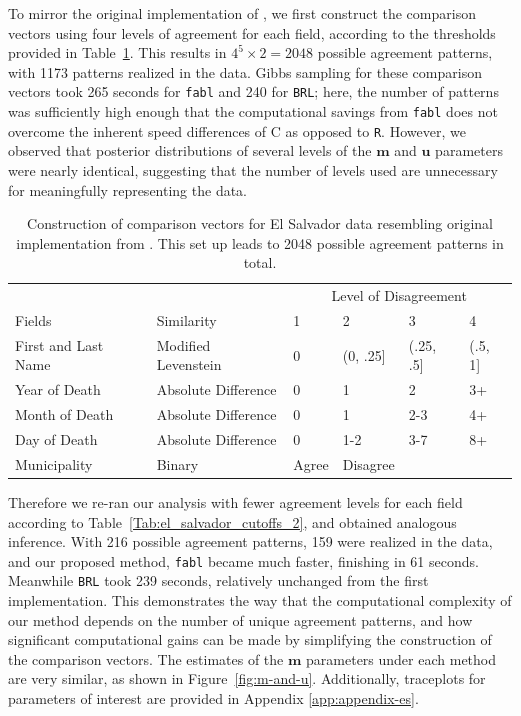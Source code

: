 \documentclass[ba]{imsart}
\begin{document}
To mirror the original implementation of \cite{sadinle_bayesian_2017}, we first construct the comparison vectors using four levels of agreement for each field, according to the thresholds provided in Table~\ref{Tab:el_salvador_cutoffs_1}. This results in \(4^5 \times 2 = 2048\) possible agreement patterns, with 1173 patterns realized in the data. Gibbs sampling for these comparison vectors took 265 seconds for \texttt{fabl} and 240 for \texttt{BRL}; here, the number of patterns was sufficiently high enough that the computational savings from \texttt{fabl} does not overcome the inherent speed differences of C as opposed to \texttt{R}. However, we observed that posterior distributions of several levels of the \(\bm{m}\) and \(\bm{u}\) parameters were nearly identical, suggesting that the number of levels used are unnecessary for meaningfully representing the data.

\begin{table}
	\begin{tabular}[t]{llllll}
		\hline
		\multicolumn{2}{c}{ } & \multicolumn{4}{c}{Level of Disagreement} \\
		\cline{3-6}
		Fields & Similarity & 1 & 2 & 3 & 4\\
		\hline
		First and Last Name & Modified Levenstein & 0 & (0, .25] & (.25, .5] & (.5, 1]\\
		Year of Death & Absolute Difference & 0 & 1 & 2 & 3+\\
		Month of Death & Absolute Difference & 0 & 1 & 2-3 & 4+\\
		Day of Death & Absolute Difference & 0 & 1-2 & 3-7 & 8+\\
		Municipality & Binary & Agree & Disagree &  & \\
		\hline
	\end{tabular}
	\caption{Construction of comparison vectors for El Salvador data resembling original implementation from \citep{sadinle2018bayesian}. This set up leads to 2048 possible agreement patterns in total.}\label{Tab:el_salvador_cutoffs_1}
\end{table}

Therefore we re-ran our analysis with fewer agreement levels for each field according to Table~\ref{Tab:el_salvador_cutoffs_2}, and obtained analogous inference. With 216 possible agreement patterns, 159 were realized in the data, and our proposed method, \texttt{fabl} became much faster, finishing in 61 seconds. Meanwhile \texttt{BRL} took 239 seconds, relatively unchanged from the first implementation. This demonstrates the way that the computational complexity of our method depends on the number of unique agreement patterns, and how significant computational gains can be made by simplifying the construction of the comparison vectors. The estimates of the \(\bm{m}\) parameters under each method are very similar, as shown in Figure~\ref{fig:m-and-u}. Additionally, traceplots for parameters of interest are provided in Appendix \ref{app:appendix-es}.
\end{document}
